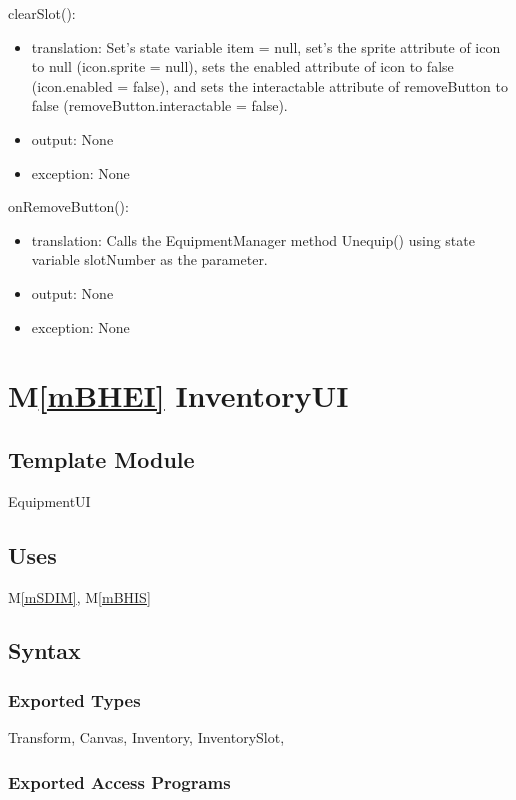 \documentclass[12pt]{article}
\newcommand{\mref}[1]{M\ref{#1}}
\begin{document}
\noindent clearSlot():
\begin{itemize}
\item translation: Set's state variable item = null, set's the sprite attribute of icon to null (icon.sprite = null), sets the enabled attribute of icon to false (icon.enabled = false), and sets the interactable attribute of removeButton to false (removeButton.interactable = false).
\item output: None
\item exception: None
\end{itemize}

\noindent onRemoveButton():
\begin{itemize}
\item translation: Calls the EquipmentManager method Unequip() using state variable slotNumber as the parameter.
\item output: None
\item exception: None
\end{itemize}

\newpage

\section* {\mref{mBHEI} InventoryUI}

\subsection*{Template Module}

EquipmentUI

\subsection* {Uses}

\mref{mSDIM}, \mref{mBHIS}

\subsection* {Syntax}

\subsubsection* {Exported Types}

Transform, Canvas, Inventory, InventorySlot, 

\subsubsection* {Exported Access Programs}
\end{document}
